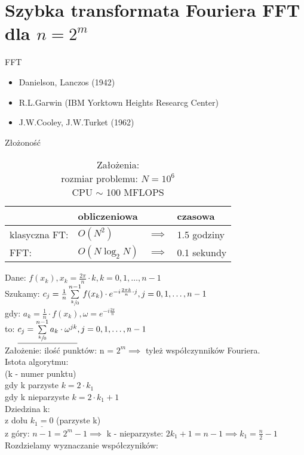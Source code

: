 \section{Szybka transformata Fouriera FFT dla $n=2^m$}
\begin{frame}[allowframebreaks]{FFT}
	\begin{itemize}
		\item Danielson, Lanczos (1942)
		\item R.L.Garwin (IBM Yorktown Heights Researcg Center)
		\item J.W.Cooley, J.W.Turket (1962)
	\end{itemize}
	\begin{table}
		\centering
		\caption{Złożoność}
		\begin{tabular}{l|lll}
			& obliczeniowa && czasowa \\
			\hline
			klasyczna FT: & $O(N^2)$ & $\implies$ & 1.5 godziny \\
			FFT: & $O(N\log_2N)$ & $\implies$ & 0.1 sekundy 
		\end{tabular}
		\caption*{Założenia: \\
			rozmiar problemu: $N = 10^6$ \\
			CPU $\sim$ 100 MFLOPS}
	\end{table}
	Dane: $f(x_k), x_k = \frac{2\pi}{n} \cdot k, k = 0, 1, \dots, n-1$ \\
	Szukamy: $c_j = \frac{1}{n} \sum\limits_{\sfrac{k}{0}}^{n-1} f(x_k) \cdot e^{-i\frac{2\pi k}{n} \cdot j}, j = 0, 1, \dots, n-1$ \\
	gdy: $a_k = \frac{1}{n} \cdot f(x_k), \omega = e^{-i\frac{2\pi}{n}}$ \\
	to: $\underline{c_j = \sum\limits_{\sfrac{k}{0}}^{n-1} a_k \cdot \omega^{jk}}, j = 0, 1, \dots, n-1$ \\
	Założenie: ilość punktów: n = $2^m \implies$ tyleż współczynników Fouriera. \\
	Istota algorytmu: \\
	(k - numer punktu) \\
	gdy k parzyste $k = 2 \cdot k_1$ \\
	gdy k nieparzyste $k = 2 \cdot k_1 + 1$ \\
	Dziedzina k: \\
	z dołu $\underline{k_1 = 0}$ (parzyste k)  \\
	z góry: $n-1 = 2^m - 1 \implies$ k - nieparzyste: $2k_1 + 1 = n-1 \implies k_1 = \frac{n}{2} - 1$ \\
	Rozdzielamy wyznaczanie współczyników: 

\end{frame}
